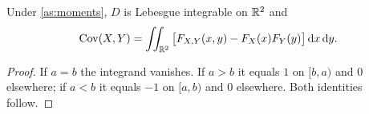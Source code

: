 \documentclass{saim-blog}
\begin{document}
\begin{mainresult}
\begin{theorem}[Hoeffding, 1940]\label{thm:main}
Under \cref{as:moments}, $D$ is Lebesgue integrable on $\mathbb{R}^2$ and
\begin{equation}\label{eq:main}
\operatorname{Cov}(X,Y)=\iint_{\mathbb{R}^2}\big[F_{X,Y}(x,y)-F_X(x)F_Y(y)\big]\mathop{}\!\mathrm{d} x\mathop{}\!\mathrm{d} y .
\end{equation}
\end{theorem}
\end{mainresult}


\SecProof


\begin{proof}
If $a=b$ the integrand vanishes. If $a>b$ it equals $1$ on $[b,a)$ and $0$ elsewhere; if $a<b$ it equals $-1$ on $[a,b)$ and $0$ elsewhere. Both identities follow.
\end{proof}
\end{document}
